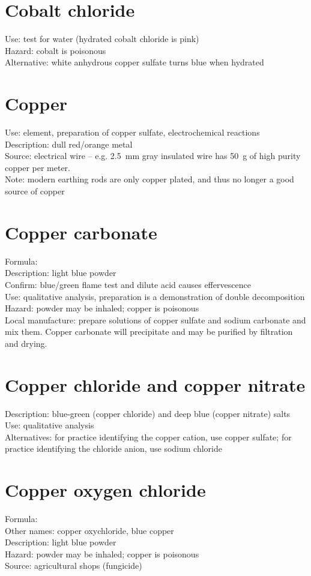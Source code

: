 \section{Cobalt chloride}
Use: test for water (hydrated cobalt chloride is pink)\\
Hazard: cobalt is poisonous\\
Alternative: white anhydrous copper sulfate turns blue when hydrated

\section{Copper}
\label{sec:copper}
Use: element, 
preparation of copper sulfate, 
electrochemical reactions\\
Description: dull red/orange metal\\
Source: electrical wire -- e.g. 
2.5~mm gray insulated wire has 50~g of high purity copper per meter.\\
Note: modern earthing rods are only copper plated, 
and thus no longer a good source of copper

\section{Copper carbonate}
Formula: \\
Description: light blue powder\\
Confirm: blue/green flame test and dilute acid causes effervescence\\
Use: qualitative analysis, 
preparation is a demonstration of double decomposition\\
Hazard: powder may be inhaled; 
copper is poisonous\\
Local manufacture: prepare solutions of copper sulfate 
and sodium carbonate and mix them. 
Copper carbonate will precipitate 
and may be purified by filtration and drying.

\section{Copper chloride and copper nitrate}
Description: blue-green (copper chloride) 
and deep blue (copper nitrate) salts \\
Use: qualitative analysis\\
Alternatives: for practice identifying the copper cation, 
use copper sulfate; 
for practice identifying the chloride anion, 
use sodium chloride

\section{Copper oxygen chloride}
Formula: \\
Other names: copper oxychloride, 
blue copper\\
Description: light blue powder\\
Hazard: powder may be inhaled; 
copper is poisonous\\
Source: agricultural shops (fungicide)

